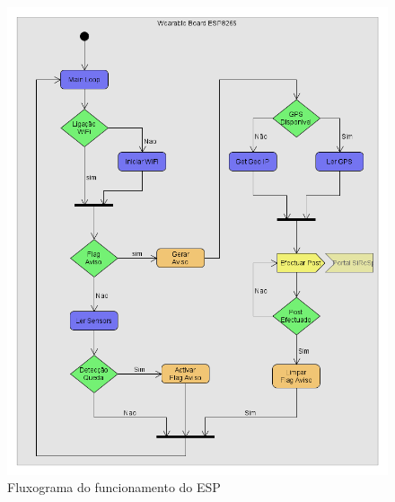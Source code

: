 \begin{figure}[!htb]
	\centering
	\includegraphics[width=\textwidth]{figuras/fluxograma_ESP.png}
	\caption{Fluxograma do funcionamento do ESP}
	\label{fig:fluxograma_ESP}
\end{figure}

